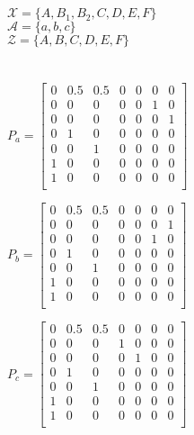 \documentclass[12pt]{article}
\begin{document}
\section{}

$ \mathcal{X} = \{ A, B_1, B_2, C, D, E, F \} $ \\


$ \mathcal{A} = \{ a, b, c \} $ \\


$ \mathcal{Z} = \{ A, B, C, D, E, F \} $ \\

\section{}

$ P_a = \begin{bmatrix}
0   & 0.5 & 0.5 & 0   & 0   & 0   & 0 \\
0   & 0   & 0   & 0   & 0   & 1   & 0 \\
0   & 0   & 0   & 0   & 0   & 0   & 1 \\
0   & 1   & 0   & 0   & 0   & 0   & 0 \\
0   & 0   & 1   & 0   & 0   & 0   & 0 \\
1   & 0   & 0   & 0   & 0   & 0   & 0 \\
1   & 0   & 0   & 0   & 0   & 0   & 0 \\
\end{bmatrix} $

$ P_b = \begin{bmatrix}
0   & 0.5 & 0.5 & 0   & 0   & 0   & 0 \\
0   & 0   & 0   & 0   & 0   & 0   & 1 \\
0   & 0   & 0   & 0   & 0   & 1   & 0 \\
0   & 1   & 0   & 0   & 0   & 0   & 0 \\
0   & 0   & 1   & 0   & 0   & 0   & 0 \\
1   & 0   & 0   & 0   & 0   & 0   & 0 \\
1   & 0   & 0   & 0   & 0   & 0   & 0 \\
\end{bmatrix} $

$ P_c = \begin{bmatrix}
0   & 0.5 & 0.5 & 0   & 0   & 0   & 0 \\
0   & 0   & 0   & 1   & 0   & 0   & 0 \\
0   & 0   & 0   & 0   & 1   & 0   & 0 \\
0   & 1   & 0   & 0   & 0   & 0   & 0 \\
0   & 0   & 1   & 0   & 0   & 0   & 0 \\
1   & 0   & 0   & 0   & 0   & 0   & 0 \\
1   & 0   & 0   & 0   & 0   & 0   & 0 \\
\end{bmatrix} $
\end{document}
